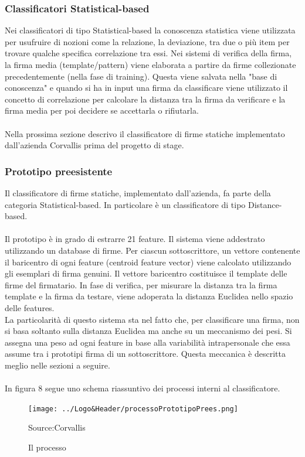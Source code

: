 \subsubsection*{Classificatori Statistical-based}
\label{2.1.3.2}
Nei classificatori di tipo Statistical-based la conoscenza statistica viene utilizzata per usufruire di nozioni come la relazione, la deviazione, tra due o più item per trovare qualche specifica correlazione tra essi. Nei sistemi di verifica della firma, la firma media (template/pattern) viene elaborata a partire da firme collezionate precedentemente (nella fase di training). Questa viene salvata nella "base di conoscenza" e quando si ha in input una firma da classificare viene utilizzato il concetto di correlazione per calcolare la distanza tra la firma da verificare e la firma media per poi decidere se accettarla o rifiutarla.\\\\
Nella prossima sezione descrivo il classificatore di firme statiche implementato dall'azienda Corvallis prima del progetto di stage.
\subsubsection{Prototipo preesistente}
\label{2.1.4}
Il classificatore di firme statiche, implementato dall'azienda, fa parte della categoria Statistical-based. In particolare è un classificatore di tipo Distance-based.\\\\
Il prototipo è in grado di estrarre 21 feature.
Il sistema viene addestrato utilizzando un database di firme. Per ciascun sottoscrittore, un vettore contenente il baricentro di ogni feature (centroid feature vector) viene calcolato utilizzando gli esemplari di firma genuini. Il vettore baricentro costituisce il template delle firme del firmatario. In fase di verifica, per misurare la distanza tra la firma template e la firma da testare, viene adoperata la distanza Euclidea nello spazio delle features.\\
La particolarità di questo sistema sta nel fatto che, per classificare una firma, non si basa soltanto sulla distanza Euclidea ma anche su un meccanismo dei pesi. Si assegna una peso ad ogni feature in base alla variabilità intrapersonale che essa assume tra i prototipi firma di un sottoscrittore. Questa meccanica è descritta meglio nelle sezioni a seguire.\\\\
In figura 8 segue uno schema riassuntivo dei processi interni al classificatore.
\begin{figure}[H]
\centering
\texttt{[image: ../Logo\&Header/processoPrototipoPrees.png]}
\caption{Il processo}Source:Corvallis
\end{figure}

